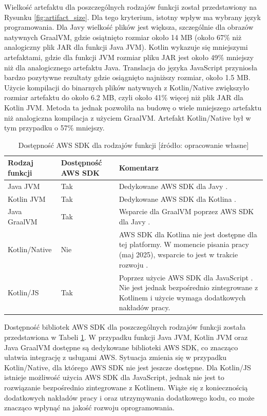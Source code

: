 Wielkość artefaktu dla poszczególnych rodzajów funkcji został przedstawiony na Rysunku \ref{fig:artifact_size}.
Dla tego kryterium, istotny wpływ ma wybrany język programowania.
Dla Javy wielkość plików jest większa, szczególnie dla obrazów natywnych GraalVM, gdzie osiątnięto rozmiar około 14 MB (około 67\% niż analogiczny plik JAR dla funkcji Java JVM).
Kotlin wykazuje się mniejszymi artefaktami, gdzie dla funkcji JVM rozmiar pliku JAR jest około 49\% mniejszy niż dla analogicznego artefaktu Java.
Translacja do języka JavaScript przyniosła bardzo pozytywne rezultaty gdzie osiągnięto najniższy rozmiar, około 1.5 MB.
Użycie kompilacji do binarnych plików natywnych z Kotlin/Native zwiększyło rozmiar artefaktu do około 6.2 MB, czyli około 41\% więcej niż plik JAR dla Kotlin JVM.
Metoda ta jednak pozwoliła na budowę o wiele mniejszego artefaktu niż analogiczna kompilacja z użyciem GraalVM.
Artefakt Kotlin/Native był w tym przypadku o 57\% mniejszy.

\begin{table}[h]
    \caption{Dostępność AWS SDK dla rodzajów funkcji [źródło: opracowanie własne]}
    \centering
    \begin{tabular}{|p{3cm}|p{3cm}|p{7cm}|} %
    \hline
    \textbf{Rodzaj funkcji} & \textbf{Dostępność AWS SDK} & \textbf{Komentarz} \\
    \hline
    Java JVM & Tak & Dedykowane AWS SDK dla Javy \cite{aws-sdk-java-v2}. \\
    \hline
    Kotlin JVM & Tak & Dedykowane AWS SDK dla Kotlina \cite{aws-sdk-kotlin}. \\
    \hline
    Java GraalVM & Tak & Wsparcie dla GraalVM poprzez AWS SDK dla Javy \cite{aws-sdk-java-v2}. \\
    \hline
    Kotlin/Native & Nie & AWS SDK dla Kotlina nie jest dostępne dla tej platformy. W momencie pisania pracy (maj 2025), wsparcie to jest w trakcie rozwoju \cite{aws-sdk-kotlin}. \\
    \hline
    Kotlin/JS & Tak & Poprzez użycie AWS SDK dla JavaScript \cite{aws-sdk-js-v3}. Nie jest jednak bezpośrednio zintegrowane z Kotlinem i użycie wymaga dodatkowych nakładów pracy. \\
    \hline
    \end{tabular}
    \label{table:aws_sdk_availability}
\end{table}

Dostępność bibliotek AWS SDK dla poszczególnych rodzajów funkcji została przedstawiona w Tabeli \ref{table:aws_sdk_availability}.
W przypadku funkcji Java JVM, Kotlin JVM oraz Java GraalVM dostępne są dedykowane biblioteki AWS SDK, co znacząco ułatwia integrację z usługami AWS. 
Sytuacja zmienia się w przypadku Kotlin/Native, dla którego AWS SDK nie jest jeszcze dostępne. 
Dla Kotlin/JS istnieje możliwość użycia AWS SDK dla JavaScript, jednak nie jest to rozwiązanie bezpośrednio zintegrowane z Kotlinem.
Wiąże się z koniecznością dodatkowych nakładów pracy i oraz utrzymywania dodatkowego kodu, co może znacząco wpłynąć na jakość rozwoju oprogramowania.

